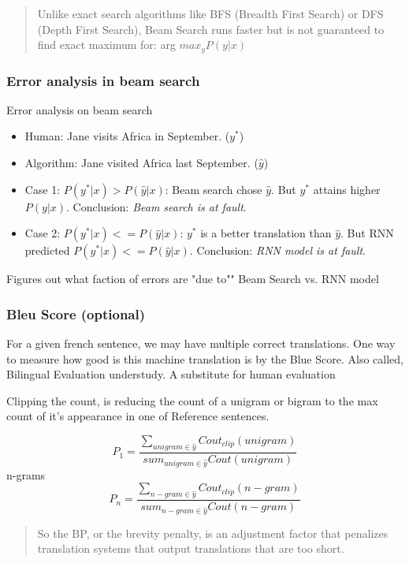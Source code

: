 \begin{quote}
    Unlike exact search algorithms like BFS (Breadth First Search) or  DFS (Depth First Search), Beam Search runs faster but is not guaranteed to find exact maximum for: arg $max_y P(y | x)$
\end{quote}

\subsubsection{Error analysis in beam search}
Error analysis on beam search

\begin{itemize}
    \item Human: Jane visits Africa in September. ($y^*$)
    \item Algorithm: Jane visited Africa last September. ($\hat{y}$)
\end{itemize}

\begin{itemize}
    \item Case 1: $P(y^* | x) > P(\hat{y} | x)$: Beam search chose $\hat{y}$. But $y^*$ attains higher $P(y | x)$. Conclusion: \textit{Beam search is at fault}.
    \item Case 2: $P(y^* | x) <= P(\hat{y} | x)$: $y^*$ is a better translation than $\hat{y}$. But RNN predicted $P(y^* | x) <= P(\hat{y} | x)$. Conclusion: \textit{RNN model is at fault}.
\end{itemize}
Figures out what faction of errors are "due to"" Beam Search vs. RNN model

\subsubsection{Bleu Score (optional)}
For a given french sentence, we may have multiple correct translations. One way to measure how good is this machine translation is by the Blue Score. Also called, Bilingual Evaluation understudy. A substitute for human evaluation

Clipping the count, is reducing the count of a unigram or bigram to the max count of it's appearance in one of Reference sentences.

\begin{equation}
P_1 = \frac{\sum_{unigram \in \hat{y}} Cout_{clip}(unigram)}{sum_{unigram \in \hat{y}} Cout(unigram)}
\end{equation}
n-grams
\begin{equation}
P_n = \frac{\sum_{n-gram \in \hat{y}} Cout_{clip}(n-gram)}{sum_{n-gram \in \hat{y}} Cout(n-gram)}
\end{equation}
\begin{quote}
     So the BP, or the brevity penalty, is an adjustment factor that penalizes translation systems that output translations that are too short.
\end{quote}

